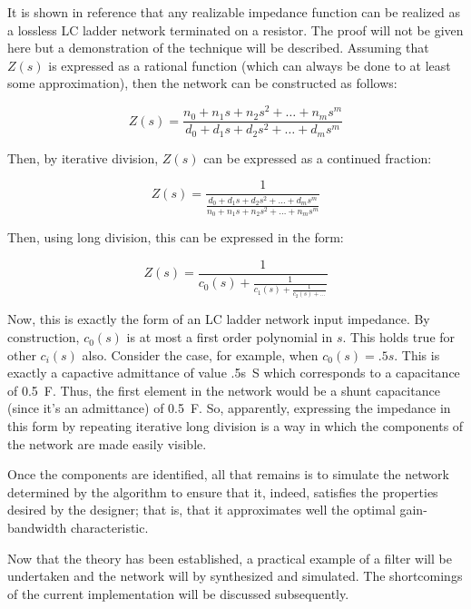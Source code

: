 It is shown in reference \cite{wcd} that any realizable impedance function can
be realized as a lossless LC ladder network terminated on a resistor. The proof
will not be given here but a demonstration of the technique will be described.
Assuming that $Z(s)$ is expressed as a rational function (which can always be
done to at least some approximation), then the network can be constructed as
follows:

\[ 
Z(s) = \frac{n_0 + n_1 s + n_2 s^2 + \ldots + n_m s^m}{d_0 + d_1 s + d_2 s^2 +
\ldots + d_m s^m} 
\]

Then, by iterative division, $Z(s)$ can be expressed as a continued fraction:

\[ 
Z(s) = \frac{1}{\frac{d_0 + d_1 s + d_2 s^2 +
\ldots + d_m s^m}{n_0 + n_1 s + n_2 s^2 + \ldots + n_m s^m}} 
\]

Then, using long division, this can be expressed in the form:

\[
Z(s) = \frac{1}{c_0(s) + \frac{1}{c_1(s) + \frac{1}{c_2(s) + \ldots}}}
\]

Now, this is exactly the form of an LC ladder network input impedance. By
construction, $c_0(s)$ is at most a first order polynomial in $s$. This holds
true for other $c_i(s)$ also. Consider the case, for example, when $c_0(s) =
.5s$. This is exactly a capactive admittance of value
\SI[parse-numbers=false]{.5s}{\siemens} which corresponds to a capacitance of
\SI{.5}{\farad}. Thus, the first element in the network would be a shunt
capacitance (since it's an admittance) of \SI{.5}{\farad}. So, apparently,
expressing the impedance in this form by repeating iterative long division is a
way in which the components of the network are made easily visible.

Once the components are identified, all that remains is to simulate the network
determined by the algorithm to ensure that it, indeed, satisfies the properties
desired by the designer; that is, that it approximates well the optimal
gain-bandwidth characteristic.

Now that the theory has been established, a practical example of a filter will
be undertaken and the network will by synthesized and simulated. The
shortcomings of the current implementation will be discussed subsequently.

